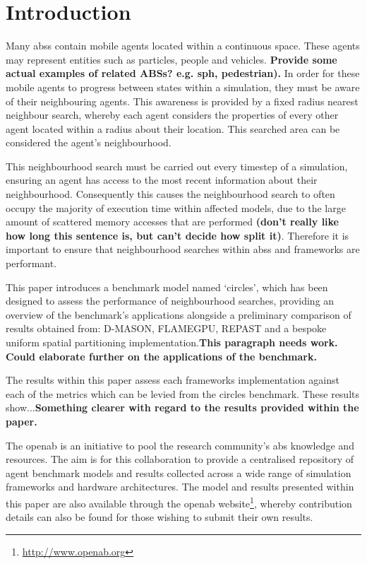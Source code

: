 
\section{Introduction}
  Many \glspl{abs} contain mobile agents located within a continuous space. These agents may represent entities such as particles, people and vehicles. \textbf{Provide some actual examples of related ABSs? e.g. sph, pedestrian).} In order for these mobile agents to progress between states within a simulation, they must be aware of their neighbouring agents. This awareness is provided by a fixed radius nearest neighbour search, whereby each agent considers the properties of every other agent located within a radius about their location. This searched area can be considered the agent's neighbourhood.
  
  This neighbourhood search must be carried out every timestep of a simulation, ensuring an agent has access to the most recent information about their neighbourhood. Consequently this causes the neighbourhood search to often occupy the majority of execution time within affected models, due to the large amount of scattered memory accesses that are performed \textbf{ (don't really like how long this sentence is, but can't decide how split it)}. Therefore it is important to ensure that neighbourhood searches within \glspl{abs} and frameworks are performant.
  
  This paper introduces a benchmark model named `circles', which has been designed to assess the performance of neighbourhood searches, providing an overview of the benchmark's applications alongside a preliminary comparison of results obtained from: D-MASON, FLAMEGPU, REPAST and a bespoke uniform spatial partitioning implementation.\textbf{This paragraph needs work. }\textbf{Could elaborate further on the applications of the benchmark.}
  
  The results within this paper assess each frameworks implementation against each of the metrics which can be levied from the circles benchmark. These results show...\textbf{Something clearer with regard to the results provided within the paper.}
  
  The \gls{openab} is an initiative to pool the research community's \gls{abs} knowledge and resources. The aim is for this collaboration to provide a centralised repository of agent benchmark models and results collected across a wide range of simulation frameworks and hardware architectures. The model and results presented within this paper are also available through the \gls{openab} website\footnote{\url{http://www.openab.org}}, whereby contribution details can also be found for those wishing to submit their own results.
  

